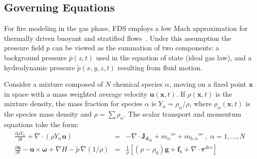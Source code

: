 \documentclass[journal,article,atmosphere,submit,moreauthors,pdftex]{Definitions/mdpi}
\begin{document}
\subsection{Governing Equations} \label{sec:goveqns}

For fire modeling in the gas phase, FDS employs a low Mach approximation for thermally driven buoyant and stratified flows~\cite{Rehm:1}. Under this assumption the pressure field $p$ can be viewed as the summation of two components: a background pressure $\bar{p}(z,t)$ used in the equation of state (ideal gas law), and a hydrodynamic pressure $\tilde{p}(x,y,z,t)$ resulting from fluid motion.

Consider a mixture composed of $N$ chemical species $\alpha$, moving on a fixed point $\mathbf{x}$ in space with a mass weighted average velocity $\mathbf{u}(\mathbf{x},t)$. If $\rho(\mathbf{x},t)$ is the mixture density, the mass fraction for species $\alpha$ is $Y_\alpha = \rho_\alpha / \rho$, where $\rho_\alpha(\mathbf{x},t)$ is the species mass density and $\rho = \sum \rho_\alpha$. The scalar transport and momentum equations take the form:
\begin{eqnarray}
   \frac{\partial \rho Y_\alpha}{ \partial t} + \nabla \cdot ( \rho Y_\alpha  \mathbf{u} ) &=& - \nabla \cdot \mathbf{J_{d}}_\alpha + \dot{m}_\alpha'''  +
    \dot{m}_{b,\alpha}'''\; , \; \alpha=1,\dots,N \label{eqn:spectran} \\
    \frac{\partial \mathbf{u}}{\partial t} - \mathbf{u} \times \boldsymbol{\omega} + \nabla H - \tilde{p} \, \nabla \left( 1/\rho\right) &=&
    \frac{1}{\rho} \left[ (\rho-\rho_0) \mathbf{g} + \mathbf{f}_{b} + \nabla \cdot \boldsymbol{\tau}^{dev} \right] \label{eqn:momtran}
\end{eqnarray}
\end{document}
